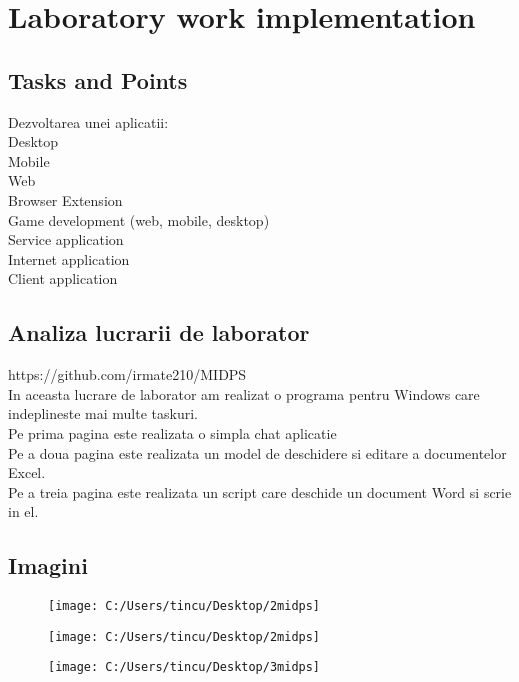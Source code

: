 \section{Laboratory work implementation}

\subsection{Tasks and Points}

Dezvoltarea unei aplicatii:\\
Desktop\\
Mobile\\
Web\\
Browser Extension\\
Game development (web, mobile, desktop)\\
Service application\\
Internet application\\
Client application\\


\subsection{Analiza lucrarii de laborator}

https://github.com/irmate210/MIDPS\\
In aceasta lucrare de laborator am realizat o programa pentru Windows care indeplineste mai multe taskuri. \\
Pe prima pagina este realizata o simpla chat aplicatie\\
Pe a doua pagina este realizata un model de deschidere si editare a documentelor Excel.\\
Pe a treia pagina este realizata un script care deschide un document Word si scrie in el.

\subsection{Imagini}

\begin{figure}
\centering
\texttt{[image: C:/Users/tincu/Desktop/2midps]}
\caption{}
\label{fig:2midps}
\end{figure}

\begin{figure}
\centering
\texttt{[image: C:/Users/tincu/Desktop/2midps]}
\caption{}
\label{fig:2midps}
\end{figure}
\begin{figure}
\centering
\texttt{[image: C:/Users/tincu/Desktop/3midps]}
\caption{}
\label{fig:3midps}
\end{figure}

\clearpage